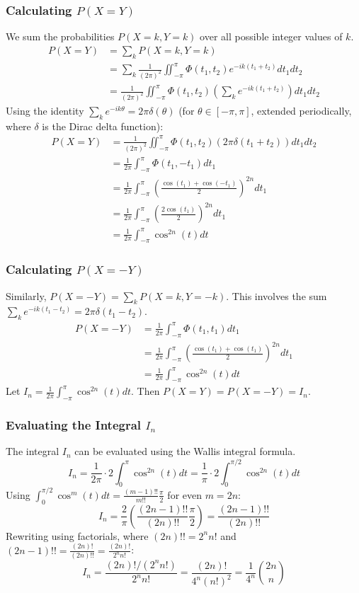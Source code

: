 \documentclass{article}
\begin{document}
\subsubsection{Calculating $P(X=Y)$}
We sum the probabilities $P(X=k, Y=k)$ over all possible integer values of $k$.
\begin{align*}
P(X=Y) &= \sum_k P(X=k, Y=k) \\
&= \sum_k \frac{1}{(2\pi)^2} \iint_{-\pi}^{\pi} \Phi(t_1, t_2) e^{-ik(t_1+t_2)} dt_1 dt_2 \\
&= \frac{1}{(2\pi)^2} \iint_{-\pi}^{\pi} \Phi(t_1, t_2) \left( \sum_k e^{-ik(t_1+t_2)} \right) dt_1 dt_2
\end{align*}
Using the identity $\sum_k e^{-ik\theta} = 2\pi \delta(\theta)$ (for $\theta \in [-\pi, \pi]$, extended periodically, where $\delta$ is the Dirac delta function):
\begin{align*}
P(X=Y) &= \frac{1}{(2\pi)^2} \iint_{-\pi}^{\pi} \Phi(t_1, t_2) (2\pi \delta(t_1+t_2)) dt_1 dt_2 \\
&= \frac{1}{2\pi} \int_{-\pi}^{\pi} \Phi(t_1, -t_1) dt_1 \\
&= \frac{1}{2\pi} \int_{-\pi}^{\pi} \left( \frac{\cos(t_1) + \cos(-t_1)}{2} \right)^{2n} dt_1 \\
&= \frac{1}{2\pi} \int_{-\pi}^{\pi} \left( \frac{2\cos(t_1)}{2} \right)^{2n} dt_1 \\
&= \frac{1}{2\pi} \int_{-\pi}^{\pi} \cos^{2n}(t) dt
\end{align*}

\subsubsection{Calculating $P(X=-Y)$}
Similarly, $P(X=-Y) = \sum_k P(X=k, Y=-k)$. This involves the sum $\sum_k e^{-ik(t_1-t_2)} = 2\pi \delta(t_1-t_2)$.
\begin{align*}
P(X=-Y) &= \frac{1}{2\pi} \int_{-\pi}^{\pi} \Phi(t_1, t_1) dt_1 \\
&= \frac{1}{2\pi} \int_{-\pi}^{\pi} \left( \frac{\cos(t_1) + \cos(t_1)}{2} \right)^{2n} dt_1 \\
&= \frac{1}{2\pi} \int_{-\pi}^{\pi} \cos^{2n}(t) dt
\end{align*}
Let $I_n = \frac{1}{2\pi} \int_{-\pi}^{\pi} \cos^{2n}(t) dt$. Then $P(X=Y) = P(X=-Y) = I_n$.

\subsubsection{Evaluating the Integral $I_n$}
The integral $I_n$ can be evaluated using the Wallis integral formula.
\[
I_n = \frac{1}{2\pi} \cdot 2 \int_{0}^{\pi} \cos^{2n}(t) dt = \frac{1}{\pi} \cdot 2 \int_{0}^{\pi/2} \cos^{2n}(t) dt
\]
Using $\int_{0}^{\pi/2} \cos^{m}(t) dt = \frac{(m-1)!!}{m!!} \frac{\pi}{2}$ for even $m=2n$:
\[
I_n = \frac{2}{\pi} \left( \frac{(2n-1)!!}{(2n)!!} \frac{\pi}{2} \right) = \frac{(2n-1)!!}{(2n)!!}
\]
Rewriting using factorials, where $(2n)!! = 2^n n!$ and $(2n-1)!! = \frac{(2n)!}{(2n)!!} = \frac{(2n)!}{2^n n!}$:
\[
I_n = \frac{(2n)! / (2^n n!)}{2^n n!} = \frac{(2n)!}{4^n (n!)^2} = \frac{1}{4^n} \binom{2n}{n}
\]
\end{document}
